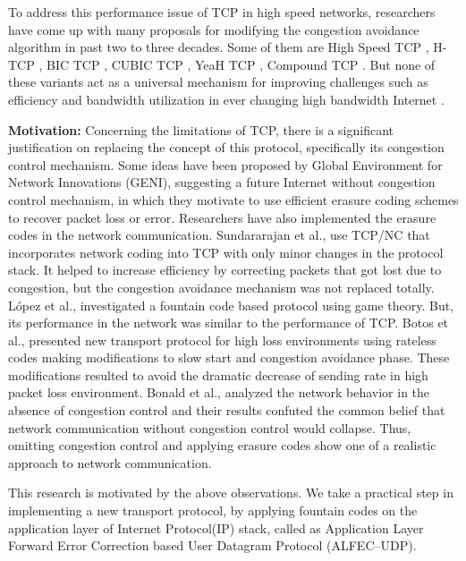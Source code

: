 To address this performance issue of TCP in high speed networks, researchers have come up with many proposals for modifying the congestion avoidance algorithm in past two to three decades. Some of them are High Speed TCP \cite{floyd2003highspeed}, H-TCP \cite{leith2004h}, BIC TCP \cite{xu2004binary}, CUBIC TCP \cite{ha2008cubic}, YeaH TCP \cite{baiocchi2007yeah}, Compound TCP \cite{tan2006compound}. But none of these variants act as a universal mechanism for improving challenges such as efficiency and bandwidth utilization in ever changing high bandwidth Internet \cite{li2007experimental} \cite{alrshah2014comparative}. 

\noindent
\textbf{Motivation:} 
Concerning the limitations of TCP, there is a significant justification on replacing the concept of this protocol, specifically its congestion control mechanism. Some ideas have been proposed by Global Environment for Network Innovations (GENI), suggesting a future Internet without congestion control mechanism, in which they motivate to use efficient erasure coding schemes to recover packet loss or error. Researchers have also implemented the erasure codes in the network communication. Sundararajan et al.,\cite{sundararajan2011network} use TCP/NC that incorporates network coding into TCP with only minor changes in the protocol stack. It helped to increase efficiency by correcting packets that got lost due to congestion, but the congestion avoidance mechanism was not replaced totally. L{\'o}pez et al., \cite{lopez2005game} investigated a fountain code based protocol using game theory. But, its performance in the network was similar to the performance of TCP. Botos et al., \cite{botocs2010analysis} presented new transport protocol for high loss environments using rateless codes making modifications to slow start and congestion avoidance phase. These modifications resulted to avoid the dramatic decrease of sending rate in high packet loss environment. Bonald et al.,\cite{bonald2009law} analyzed the network behavior in the absence of congestion control and their results confuted the common belief that network communication without congestion control would collapse. Thus, omitting congestion control and applying erasure codes show one of a realistic approach to network communication.

This research is motivated by the above observations. We take a practical step in implementing a new transport protocol, by applying fountain codes on the application layer of Internet Protocol(IP) stack, called as Application Layer Forward Error Correction based User Datagram Protocol (ALFEC--UDP). 

